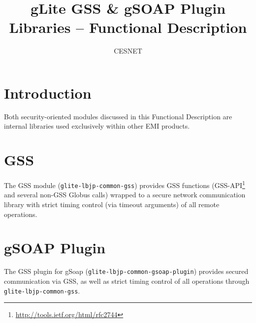\documentclass[]{emi}
\title{gLite GSS \& gSOAP Plugin Libraries -- Functional Description}
\author{CESNET}
\begin{document}
\tableofcontents

\newpage

\section{Introduction}

Both security-oriented modules discussed in this Functional Description are internal libraries used exclusively within other EMI products.

\section{GSS}
The GSS module (\texttt{glite-lbjp-common-gss}) provides GSS functions (GSS-API\footnote{\url{http://tools.ietf.org/html/rfc2744}} and several non-GSS Globus calls) wrapped to a secure network communication library with strict timing control (via timeout arguments) of all remote operations.

\section{gSOAP Plugin}
The GSS plugin for gSoap (\texttt{glite-lbjp-common-gsoap-plugin}) provides secured communication via GSS, as well as strict timing control of all operations through \texttt{glite-lbjp-common-gss}.
\end{document}
